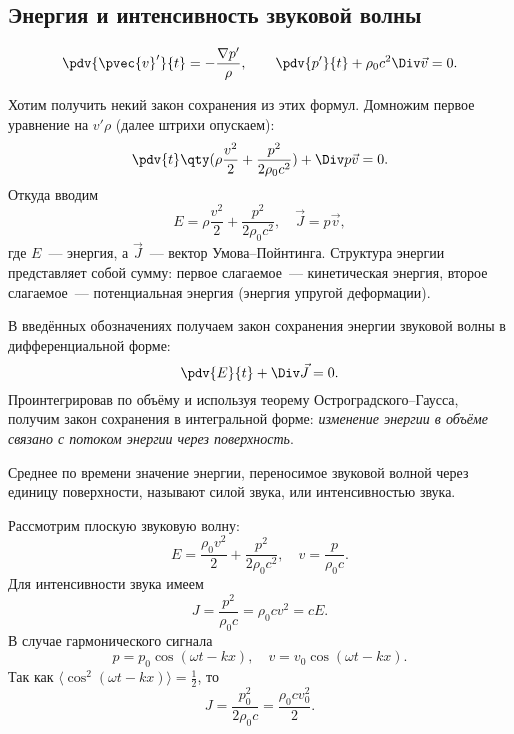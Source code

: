 

\subsection{Энергия и интенсивность звуковой волны}

\begin{equation}
    \pdv{\pvec{v}'}{t} = -\frac{\nabla p'}{\rho}, \qquad
    \pdv{p'}{t} +\rho_0 c^2 \Div \vec{v} = 0.
\end{equation}

Хотим получить некий закон сохранения из этих формул. Домножим первое
уравнение на $v' \rho$ (далее штрихи опускаем):
\begin{equation}
    \pdv{t}\qty(
        \rho \frac{v^2}{2} + \frac{p^2}{2\rho_0 c^2})
 + \Div p \vec{v} = 0.
\end{equation}
Откуда вводим
\begin{equation}
    E = \rho \frac{v^2}{2} + \frac{p^2}{2\rho_0 c^2}, \quad
    \vec{J} = p \vec{v},
\end{equation}
где $E$~--- энергия, а $\vec{J}$~--- вектор Умова--Пойнтинга.
Структура энергии представляет собой сумму: первое слагаемое~--- кинетическая энергия, второе слагаемое~--- потенциальная энергия (энергия упругой деформации).

В введённых обозначениях получаем закон сохранения энергии звуковой волны в дифференциальной форме:
\begin{equation}
	\pdv{E}{t}+\Div \vec{J}=0.
\end{equation}
Проинтегрировав по объёму и используя теорему Остроградского--Гаусса, получим закон сохранения в интегральной форме: \textit{изменение энергии в объёме связано с потоком энергии через поверхность}.

Среднее по времени значение энергии, переносимое звуковой волной через единицу поверхности, называют силой звука, или интенсивностью звука.

Рассмотрим плоскую звуковую волну:
\begin{equation}
    E = \frac{\rho_0 v^2}{2}+\frac{p^2}{2\rho_0 c^2}, \quad v = \frac{p}{\rho_0 c}.
\end{equation}
Для интенсивности звука имеем
\begin{equation}
	J = \frac{p^2}{\rho_0 c} = \rho_0 c v^2 = cE.
\end{equation}
В случае гармонического сигнала
\begin{equation}
    p = p_0 \cos(\omega t - kx), \quad v=v_0 \cos(\omega t -kx).
\end{equation}
Так как $\langle\cos^2(\omega t - kx)\rangle=\frac12$, то
\begin{equation}
	{J} = \frac{p_0^2}{2\rho_0 c} = \frac{\rho_0 c v_0^2}{2}.
\end{equation}



